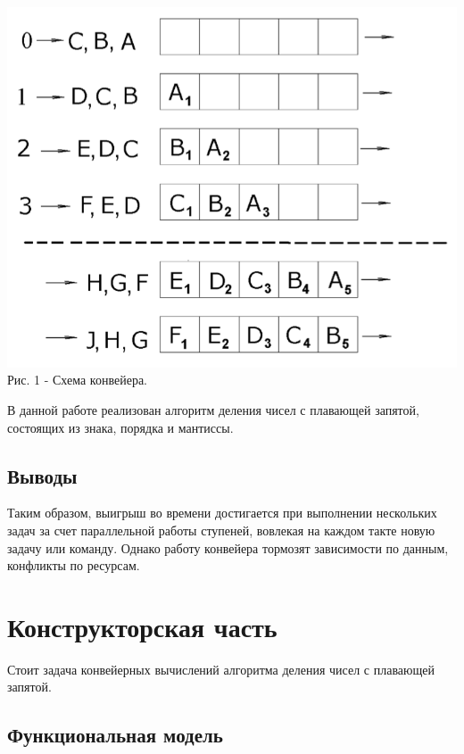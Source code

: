 \documentclass[a4paper,14pt]{article} %
\begin{document}
	\begin{center}
		\includegraphics[scale = 0.8]{img1} \\ Рис.  1 - Схема конвейера. 
	\end{center}
	
	В данной работе реализован алгоритм деления чисел с плавающей запятой, состоящих из знака, порядка и мантиссы. 
        	                
        \subsection{Выводы} 
        \hfill
        
        Таким образом, выигрыш     во    времени достигается при  выполнении  нескольких задач  за  счет параллельной   работы   ступеней,  вовлекая  на  каждом такте новую задачу или команду. Однако работу конвейера тормозят зависимости  по данным, конфликты по ресурсам. 

	\newpage

	\section{Конструкторская часть}
	\hfill
	
	Стоит задача конвейерных вычислений алгоритма деления чисел с плавающей запятой. 
		
	\subsection{Функциональная модель}
	
\end{document}
